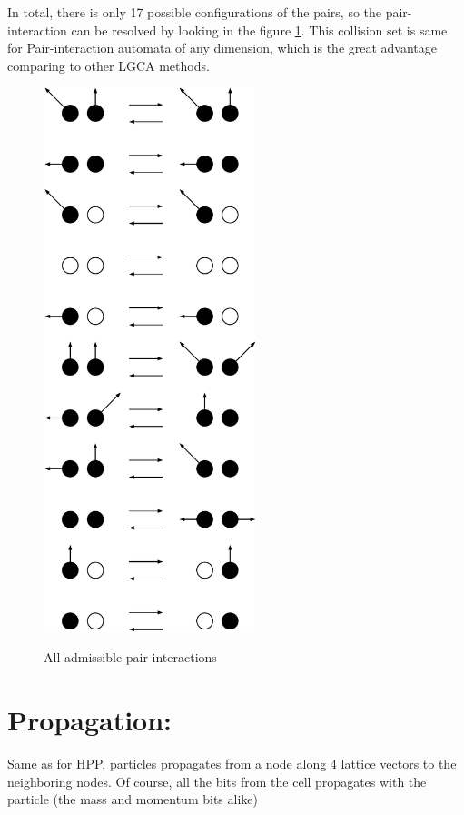In total, there is only 17 possible configurations of the pairs, so the pair-interaction can be resolved by looking in the figure \ref{transitionss}. This collision set is same for Pair-interaction automata of any dimension, which is the great advantage comparing to other LGCA methods.
\begin{figure}[H]
 \centering 
 \includegraphics[width=0.55\textwidth]{./img/allpairs}
 \label{transitionss}
 \caption{All admissible pair-interactions}
\end{figure}

\section{Propagation:}
Same as for HPP, particles propagates from a node along $4$ lattice vectors to the neighboring nodes. Of course, all the bits from the cell propagates with the particle (the mass and momentum bits alike)


